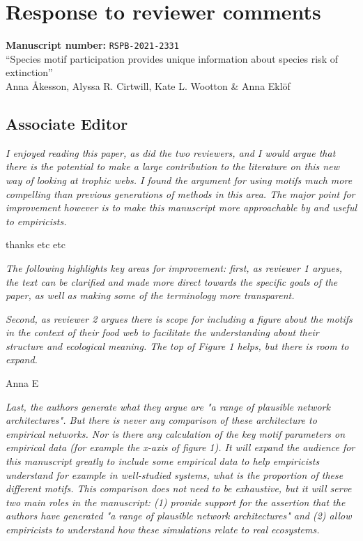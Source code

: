 \documentclass[12pt]{article}
\newcommand{\us}{\rm \setlength{\leftskip}{0.3cm} \setlength{\rightskip}{0.3cm}}
\newcommand{\them}{\it \setlength{\leftskip}{0cm} \setlength{\rightskip}{0cm}}
\begin{document}
 

\section*{Response to reviewer comments}

\begin{flushleft}
\textbf{Manuscript number: } \texttt{RSPB-2021-2331} \\
``Species motif participation provides unique information about species risk of extinction''\\
Anna {\AA}kesson, Alyssa R. Cirtwill, Kate L. Wootton \& Anna Ekl\"of
\end{flushleft}




\subsection*{Associate Editor}
\them
I enjoyed reading this paper, as did the two reviewers, and I would argue that there is the potential to make a large contribution to the literature on this new way of looking at trophic webs. I found the argument for using motifs much more compelling than previous generations of methods in this area. The major point for improvement however is to make this manuscript more approachable by and useful to empiricists.  

\us
thanks etc etc

\them 
The following highlights key areas for improvement: first, as reviewer 1 argues, the text can be clarified and made more direct towards the specific goals of the paper, as well as making some of the terminology more transparent.  

\us
 

\them
Second, as reviewer 2 argues there is scope for including a figure about the motifs in the context of their food web to facilitate the understanding about their structure and ecological meaning. The top of Figure 1 helps, but there is room to expand.  

\us
Anna E

\them
Last, the authors generate what they argue are "a range of plausible network architectures".  But there is never any comparison of these architecture to empirical networks.  Nor is there any calculation of the key motif parameters on empirical data (for example the x-axis of figure 1). It will expand the audience for this manuscript greatly to include some empirical data to help empiricists understand for example in well-studied systems, what is the proportion of these different motifs.  This comparison does not need to be exhaustive, but it will serve two main roles in the manuscript: (1) provide support for the assertion that the authors have generated "a range of plausible network architectures" and (2) allow empiricists to understand how these simulations relate to real ecosystems.  
\end{document}

